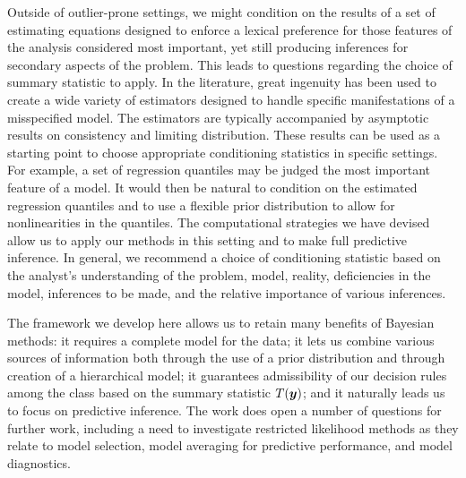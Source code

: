 \documentclass[ba]{imsart}
\newcommand{\by}{\mbox{\boldmath $y$}}
\newcommand{\green}[1]{{\color{green}#1}}
\begin{document}
Outside of outlier-prone settings, we might condition on the results of a set of estimating equations designed to enforce a lexical preference for those features of the analysis considered most important, yet still producing inferences for secondary aspects of the problem. This leads to questions regarding the choice of summary statistic to apply. In the literature, great ingenuity has been used to create a wide variety of estimators designed to handle specific manifestations of a misspecified model.  The estimators are typically accompanied by asymptotic results on consistency and limiting distribution.  These results can be used as a starting point to choose appropriate conditioning statistics in specific settings.  For example, a set of regression quantiles may be judged the most important feature of a model.  It would then be natural to condition on the estimated regression quantiles and to use a flexible prior distribution to allow for nonlinearities in the quantiles.  The computational strategies we have devised allow us to apply our methods in this setting and to make full predictive inference.  In general, we recommend a choice of conditioning statistic based on the analyst's understanding of the problem, model, reality, deficiencies in the model,  inferences to be made, and the relative importance of various inferences.  

The framework we develop here allows us to retain many benefits of Bayesian methods:  it requires a complete model for the data; it lets us combine various sources of information both through the use of a prior distribution and through creation of a hierarchical model; it guarantees admissibility of our decision rules among the class based on the summary statistic $T(\by)$; and it naturally leads us to focus on predictive inference.  The work does open a number of questions for further work, including a need to investigate restricted likelihood methods as they relate to model selection, model averaging for predictive performance, and model diagnostics. 




\end{document}
